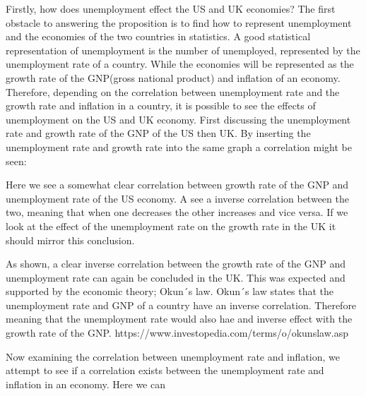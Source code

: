 Firstly, how does unemployment effect the US and UK economies?
The first obstacle to answering the proposition is to find how to represent unemployment and the economies of the two countries in statistics.
A good statistical representation of unemployment is the number of unemployed, represented by the unemployment rate of a country.
While the economies will be represented as the growth rate of the GNP(gross national product) and inflation of an economy.
Therefore, depending on the correlation between unemployment rate and the growth rate and inflation in a country, it is possible to see the effects of unemployment on the US and UK economy.
First discussing the unemployment rate and growth rate of the GNP of the US then UK.
By inserting the unemployment rate and growth rate into the same graph a correlation might be seen:


Here we see a somewhat clear correlation between growth rate of the GNP and unemployment rate of the US economy.
A see a inverse correlation between the two, meaning that when one decreases the other increases and vice versa.
If we look at the effect of the unemployment rate on the growth rate in the UK it should mirror this conclusion.


As shown, a clear inverse correlation between the growth rate of the GNP and unemployment rate can again be concluded in the UK.
This was expected and supported by the economic theory; Okun´s law.
Okun´s law states that the unemployment rate and GNP of a country have an inverse correlation.
Therefore meaning that the unemployment rate would also hae and inverse effect with the growth rate of the GNP. https://www.investopedia.com/terms/o/okunslaw.asp

Now examining the correlation between unemployment rate and inflation, we attempt to see if a correlation exists between the unemployment rate and inflation in an economy.
Here we can


